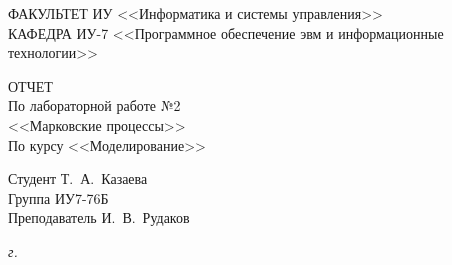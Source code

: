 \begin{titlepage}
	{
		\small \raggedright
		ФАКУЛЬТЕТ ИУ <<Информатика и системы управления>> \\
		\vspace{3.3mm}
		КАФЕДРА ИУ-7 <<Программное обеспечение эвм и информационные технологии>> \\
	}

	\vspace{15.8mm}

	{
		\LARGE
		ОТЧЕТ \\
	}
	\vspace{5mm}
	{
		\large
		По лабораторной работе №2 \\
		\vspace{2mm}
		<<Марковские процессы>> \\
		\vspace{2mm}
		По курсу <<Моделирование>>
	}

	\vfill

	Студент \hspace*{2.5cm} \hfill  Т.~А.~Казаева\\
	Группа \hspace*{2.5cm} \hfill  	ИУ7-76Б\\
	Преподаватель \hspace*{2.5cm} \hfill  И.~В.~Рудаков\\
	
	
	\vspace{20mm}
	
	\textit{{\the\year} г.}
	
\end{titlepage}